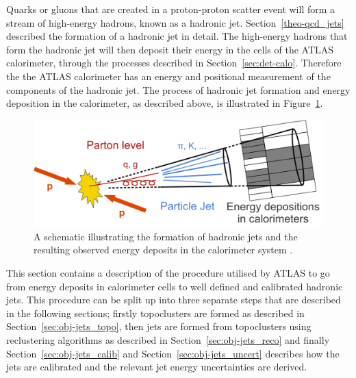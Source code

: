 Quarks or gluons that are created in a proton-proton scatter event
will form a stream of high-energy hadrons, known as a hadronic jet.
Section~\ref{theo-qcd_jets} described the formation of a hadronic jet in detail.
The high-energy hadrons that form the hadronic jet will then deposit their energy in the cells of the ATLAS calorimeter,
through the processes described in Section~\ref{sec:det-calo}.
Therefore the the ATLAS calorimeter has an energy and positional measurement of the components of the hadronic jet.
The process of hadronic jet formation and energy deposition in the calorimeter, as described above, is illustrated in Figure~\ref{fig:obj-jets_schem}.


\begin{figure}[!ht]
  \begin{center}
    \includegraphics[width=0.7\linewidth, angle=0]{figs/Objects/jets_schem.png}
  \end{center}
  \caption[A schematic illustrating the formation of hadronic jets and the resulting observed energy deposits in the calorimeter system.]
          {A schematic illustrating the formation of hadronic jets and the resulting observed energy deposits in the calorimeter system \cite{obj-jets_schem}.}
  \label{fig:obj-jets_schem}
\end{figure}

This section contains a description of the procedure utilised by ATLAS
to go from energy deposits in calorimeter cells to well defined and calibrated hadronic jets.
This procedure can be split up into three separate steps that are described in the following sections;
firstly topoclusters are formed as described in Section~\ref{sec:obj-jets_topo},
then jets are formed from topoclusters using reclustering algorithms as described in Section~\ref{sec:obj-jets_reco}
and finally Section~\ref{sec:obj-jets_calib} and Section~\ref{sec:obj-jets_uncert}
describes how the jets are calibrated and the relevant jet energy uncertainties are derived.

